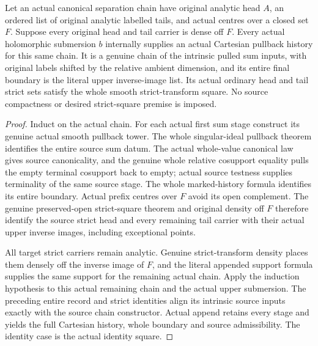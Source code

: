 \begin{theorem}
\label{hir:original-actual-separation-chain-smooth-pullback}
\leanok
Let an actual canonical separation chain have original analytic head
$A$, an ordered list of original analytic labelled tails, and actual
centres over a closed set $F$. Suppose every original head and tail
carrier is dense off $F$. Every actual holomorphic submersion $b$
internally supplies an actual Cartesian pullback history for this
same chain. It is a genuine chain of the intrinsic pulled sum inputs,
with original labels shifted by the relative ambient dimension, and
its entire final boundary is the literal upper inverse-image list.
Its actual ordinary head and tail strict sets satisfy the whole
smooth strict-transform square. No source compactness or desired
strict-square premise is imposed.
\end{theorem}
\begin{proof}
Induct on the actual chain. For each actual first sum stage construct
its genuine actual smooth pullback tower. The whole singular-ideal
pullback theorem identifies the entire source sum datum. The actual
whole-value canonical law gives source canonicality, and the genuine
whole relative cosupport equality pulls the empty terminal cosupport
back to empty; actual source testness supplies terminality of the
same source stage. The whole marked-history formula identifies its
entire boundary. Actual prefix centres over $F$ avoid its open
complement. The genuine preserved-open strict-square theorem and
original density off $F$ therefore identify the source strict head
and every remaining tail carrier with their actual upper inverse
images, including exceptional points.

All target strict carriers remain analytic. Genuine strict-transform
density places them densely off the inverse image of $F$, and the
literal appended support formula supplies the same support for the
remaining actual chain. Apply the induction hypothesis to this actual
remaining chain and the actual upper submersion. The preceding entire
record and strict identities align its intrinsic source inputs exactly
with the source chain constructor. Actual append retains every stage
and yields the full Cartesian history, whole boundary and source
admissibility. The identity case is the actual identity square.
\end{proof}

